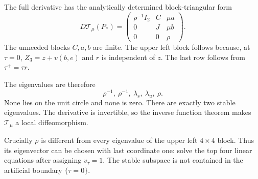 \documentclass[10pt,oneside,openany]{book}
\theoremstyle{remark}\newtheorem{remark}{Remark}[chapter]
\begin{document}
The full derivative has the analytically determined block-triangular form
\begin{equation}\label{L:eq:jacobian}
 D\mathcal T_\mu(P_*)=
 \begin{pmatrix}
 \rho^{-1}I_2&C&\mu a\\
 0&J&\mu b\\
 0&0&\rho
 \end{pmatrix}.
\end{equation}
The unneeded blocks $C,a,b$ are finite. The upper left block follows because, at $\tau=0$, $Z_3=z+v(b,e)$ and $r$ is independent of $z$. The last row follows from $\tau^+=\tau r$.

The eigenvalues are therefore
\[
 \rho^{-1},\ \rho^{-1},\ \lambda_s,\ \lambda_u,\ \rho.
\]
None lies on the unit circle and none is zero. There are exactly two stable eigenvalues. The derivative is invertible, so the inverse function theorem makes $\mathcal T_\mu$ a local diffeomorphism.

Crucially $\rho$ is different from every eigenvalue of the upper left $4\times4$ block. Thus its eigenvector can be chosen with last coordinate one: solve the top four linear equations after assigning $v_\tau=1$. The stable subspace is not contained in the artificial boundary $\{\tau=0\}$.
\end{document}
